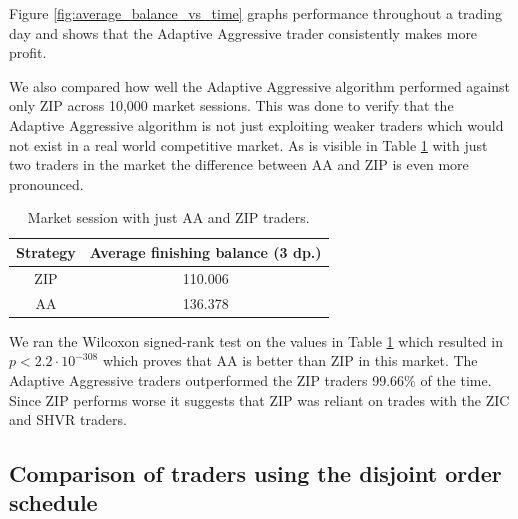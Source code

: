 \documentclass[preprint]{acm_proc_article-sp} %
\begin{document}
Figure \ref{fig:average_balance_vs_time} graphs performance throughout a trading day and shows that the Adaptive Aggressive trader consistently
makes more profit.

We also compared how well the Adaptive Aggressive algorithm performed against
only ZIP across 10,000 market sessions. This was done to verify that the
Adaptive Aggressive algorithm is not just exploiting weaker traders which would
not exist in a real world competitive market. As is visible in Table
\ref{tbl:two_traders} with just two traders in the market the difference
between AA and ZIP is even more pronounced.
\begin{table}[H]
  \centering
  \begin{tabular}{ | c | c | }
    \hline
    Strategy & Average finishing balance (3 dp.) \\
    \hline
    ZIP & 110.006 \\
    AA & 136.378 \\
    \hline
  \end{tabular}
  \caption{Market session with just AA and ZIP traders.}
  \label{tbl:two_traders}
\end{table}

We ran the Wilcoxon signed-rank test on the values in Table
\ref{tbl:two_traders} which resulted in $p < 2.2 \cdot 10^{-308}$ which proves that AA is better than ZIP in this market. The Adaptive Aggressive
traders outperformed the ZIP traders 99.66\% of the time. Since ZIP performs worse it suggests that ZIP was reliant on trades with the
ZIC and SHVR traders.\\


\subsection{Comparison of traders using the disjoint order schedule}
\end{document}
